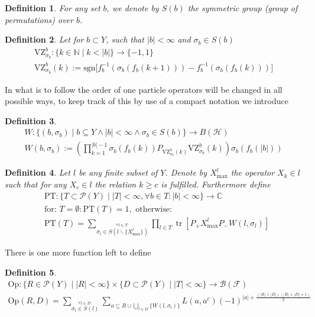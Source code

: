 \documentclass[b5paper,draft,openbib,12pt]{memoir}
\newtheorem{Def}{Definition}
\DeclareMathOperator{\tr}{tr}
\begin{document}
\begin{Def}
For any set \(b\), we denote by \(S(b)\) the symmetric group (group of permutations) over \(b\).
\end{Def}

\begin{Def}
Let for  \(b\subset Y\), such that \(|b|<\infty\) and \(\sigma_b \in S(b)\)
\begin{align*}
\text{VZ}^b_{\sigma_b}: \{k\in\mathbb{N}\mid k<|b|\} \rightarrow \{-1,1\}\\
\text{VZ}^b_{\sigma_b}(k):=\text{sgn}\big[f_b^{-1}(\sigma_b(f_b(k+1))) - f_b^{-1}(\sigma_b(f_b(k)))  \big]
\end{align*}
\end{Def}

In what is to follow the order of one particle operators will be changed in all possible ways, to keep track of this by
use of a compact notation we introduce
\begin{Def}
\begin{align*}
W: \{(b,\sigma_b) \mid b\subseteq Y \wedge |b|<\infty \wedge \sigma_b \in S(b) \} \rightarrow B(\mathcal{H})\\
W(b,\sigma_b):= \left( \prod_{k=1}^{|b|-1} \sigma_{b}(f_b(k)) P_{\text{VZ}_{\sigma_b}^b(k)} \text{VZ}_{\sigma_b}^b(k) \right) \sigma_b (f_b(|b|))
\end{align*}
\end{Def}

\begin{Def} Let \(l\) be any finite subset of \(Y\). Denote by \(X^l_{\text{max}}\) the operator \(X_k\in l \)
such that for any \(X_c\in l \) the relation \(k\ge c\) is fulfilled. Furthermore define
\begin{align*}
&\text{PT}: \{T\subset \mathcal{P}(Y)\mid |T|<\infty, \forall b\in T: |b|<\infty\}\rightarrow \mathbb{C}\\
&\text{for: } T=\emptyset: \text{PT}(T)=1, \text{ otherwise: }\\
&\text{PT}(T)=\sum_{\stackrel{\forall l \in T:}{\sigma_l \in S(l \backslash \{X_{\text{max}}^l\})}} \prod_{l\in T} 
\tr [P_+ X^l_{\text{max}} P_- W(l, \sigma_l)]
\end{align*}
\end{Def}

There is one more function left to define
\begin{Def}
\begin{align*}
\text{Op}:  \{R\in \mathcal{P}(Y)\mid |R|<\infty\} \times \{D\subset \mathcal{P}(Y)\mid |T|<\infty\}\rightarrow \mathcal{B}(\mathcal{F})\\
\text{Op}(R,D)=\sum_{\stackrel{\forall l \in D:}{\sigma_l \in S(l)}} \sum_{a \subseteq R \cup \bigcup_{l\in D} \{W(l,\sigma_l)\}} L(a,a^c)(-1)^{|a|+  \frac{(|R| + |D|)(|R|+|D|+1)}{2}}
\end{align*}
\end{Def}
\end{document}
